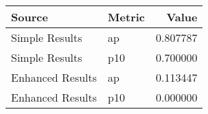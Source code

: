\begin{tabular}{llr}
\toprule
Source & Metric & Value \\
\midrule
Simple Results & ap & 0.807787 \\
Simple Results & p10 & 0.700000 \\
Enhanced Results & ap & 0.113447 \\
Enhanced Results & p10 & 0.000000 \\
\bottomrule
\end{tabular}
